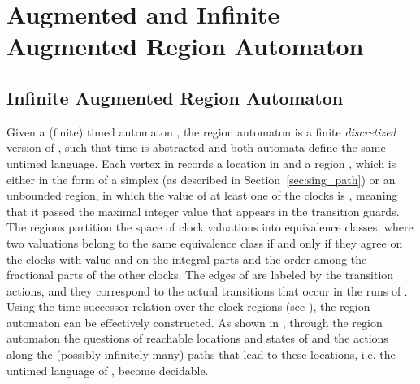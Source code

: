 \documentclass[11pt]{amsart}
\theoremstyle{definition}
\begin{document}
\section{Augmented and Infinite Augmented Region Automaton}
\label{sec:IARA}
\subsection{Infinite Augmented Region Automaton}
Given a (finite) timed automaton , the region automaton  \cite{ta} is a finite \emph{discretized} version of , such that time is abstracted and both automata define the same untimed language.
Each vertex in  records a location  in  and a region , which is either in the form of a simplex (as described in Section~\ref{sec:sing_path}) or an unbounded region, in which the value of at least one of the clocks is , meaning that it passed the maximal integer value  that appears in the transition guards.
The regions partition the space of clock valuations into equivalence classes, where two valuations belong to the same equivalence class if and only if they agree on the clocks with  value and on the integral parts and the order among the fractional parts of the other clocks.
The edges of  are labeled by the transition actions, and they correspond to the actual transitions that occur in the runs of .
Using the time-successor relation over the clock regions (see \cite{ta}), the region automaton can be effectively constructed.
As shown in \cite{ta}, through the region automaton the questions of reachable locations and states of  and the actions along the (possibly infinitely-many) paths that lead to these locations, i.e. the untimed language of , become decidable.
\end{document}
